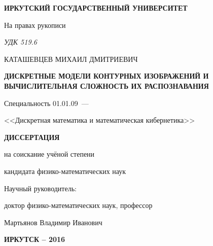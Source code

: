\thispagestyle{empty}

\begin{center}
\MakeTextUppercase{\bf Иркутский государственный университет}
\par
\end{center}

\vspace{5mm}
\begin{flushright}
На правах рукописи

{\sl УДК 519.6}
\end{flushright}

\vspace{10mm}
\begin{center}
{\large КАТАШЕВЦЕВ МИХАИЛ ДМИТРИЕВИЧ}
\end{center}

\vspace{5mm}
\begin{center}
{\bf \large \MakeTextUppercase{Дискретные модели контурных изображений и вычислительная сложность их распознавания}
\par}

\vspace{10mm}
{%
Специальность 01.01.09~---

<<Дискретная математика и математическая кибернетика>>
}

\vspace{10mm}
\textbf{\MakeTextUppercase{Диссертация}}

на соискание учёной степени

кандидата физико-математических наук
\end{center}

\vspace{20mm}
\begin{flushright}
Научный руководитель:

доктор физико-математических наук, профессор

Мартьянов Владимир Иванович

\end{flushright}

\vspace{20mm}
\begin{center}
\textbf{\MakeTextUppercase{Иркутск -- 2016}}
\end{center}

\newpage